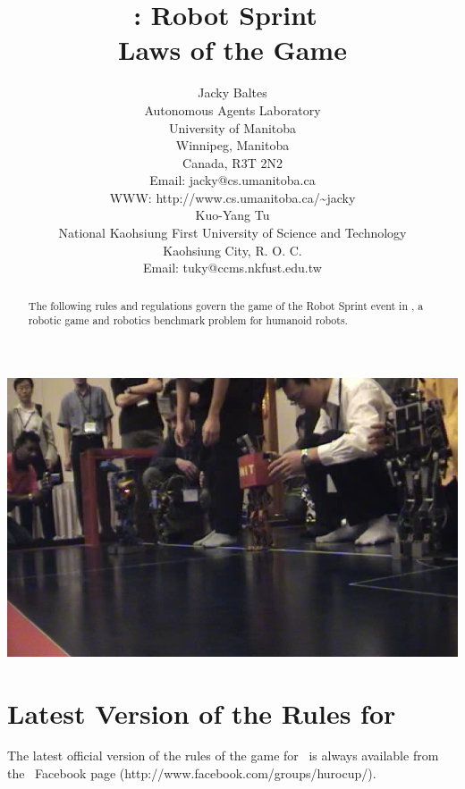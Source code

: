 \documentclass[12pt]{hurocup}
\begin{document}
\title{\HuroCup: Robot Sprint\ \\
  Laws of the Game \thisyear}

\author{Jacky Baltes\\
Autonomous Agents Laboratory\\
University of Manitoba\\
Winnipeg, Manitoba\\
Canada, R3T 2N2\\
Email: jacky@cs.umanitoba.ca\\
WWW: http://www.cs.umanitoba.ca/\~{ }jacky\\[5mm]
Kuo-Yang Tu\\
National Kaohsiung First University of Science and Technology\\
Kaohsiung City, R. O. C.\\
Email: tuky@ccms.nkfust.edu.tw\\
}

\maketitle

\begin{center}
 \includegraphics[width=0.7\linewidth]{Figures/sprint-life}
\end{center}

\begin{abstract}
The following rules and regulations govern the game of the Robot Sprint
event in \HuroCup, a robotic game and robotics benchmark problem for
humanoid robots.
%
\end{abstract}

\section*{Latest Version of the Rules for \HuroCup}
\label{sec:updates}

The latest official version of the rules of the game for \HuroCup\ is
always available from the \HuroCup\ Facebook page
(http://www.facebook.com/groups/hurocup/).
\end{document}
